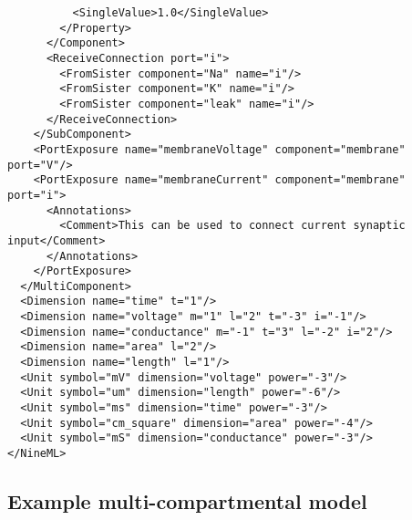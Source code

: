 \documentclass[draftspec]{ninemlspec}
\begin{document}
\begin{lstlisting}
          <SingleValue>1.0</SingleValue>
        </Property>
      </Component>
      <ReceiveConnection port="i">
        <FromSister component="Na" name="i"/>
        <FromSister component="K" name="i"/>
        <FromSister component="leak" name="i"/>
      </ReceiveConnection>
    </SubComponent>
    <PortExposure name="membraneVoltage" component="membrane" port="V"/>
    <PortExposure name="membraneCurrent" component="membrane" port="i">
      <Annotations>
        <Comment>This can be used to connect current synaptic input</Comment>
      </Annotations>
    </PortExposure>
  </MultiComponent>
  <Dimension name="time" t="1"/>
  <Dimension name="voltage" m="1" l="2" t="-3" i="-1"/>
  <Dimension name="conductance" m="-1" t="3" l="-2" i="2"/>
  <Dimension name="area" l="2"/>
  <Dimension name="length" l="1"/>
  <Unit symbol="mV" dimension="voltage" power="-3"/>
  <Unit symbol="um" dimension="length" power="-6"/>
  <Unit symbol="ms" dimension="time" power="-3"/>
  <Unit symbol="cm_square" dimension="area" power="-4"/>
  <Unit symbol="mS" dimension="conductance" power="-3"/>  
</NineML>\end{lstlisting}

\clearpage
\subsection{Example multi-compartmental model}
\end{document}
